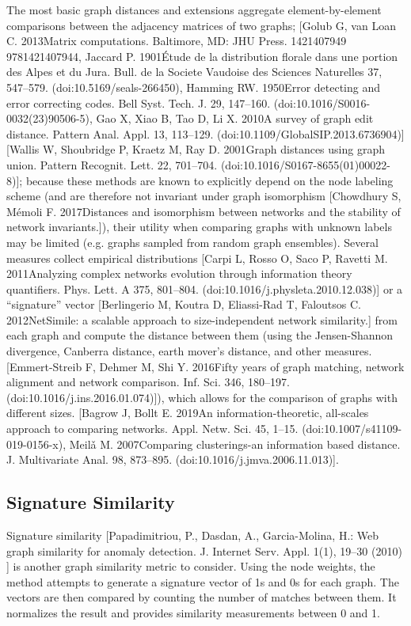 The most basic graph distances and extensions aggregate element-by-element comparisons between the adjacency matrices of two graphs; [Golub G, van Loan C. 2013Matrix computations. Baltimore, MD: JHU Press. 1421407949 9781421407944,  Jaccard P. 1901Étude de la distribution florale dans une portion des Alpes et du Jura. Bull. de la Societe Vaudoise des Sciences Naturelles 37, 547–579. (doi:10.5169/seals-266450),  Hamming RW. 1950Error detecting and error correcting codes. Bell Syst. Tech. J. 29, 147–160. (doi:10.1016/S0016-0032(23)90506-5),  Gao X, Xiao B, Tao D, Li X. 2010A survey of graph edit distance. Pattern Anal. Appl. 13, 113–129. (doi:10.1109/GlobalSIP.2013.6736904)][Wallis W, Shoubridge P, Kraetz M, Ray D. 2001Graph distances using graph union. Pattern Recognit. Lett. 22, 701–704. (doi:10.1016/S0167-8655(01)00022-8)]; because these methods are known to explicitly depend on the node labeling scheme (and are therefore not invariant under graph isomorphism [Chowdhury S, Mémoli F. 2017Distances and isomorphism between networks and the stability of network invariants.]), their utility when comparing graphs with unknown labels  may be limited (e.g. graphs sampled from random graph ensembles). Several measures collect empirical distributions [Carpi L, Rosso O, Saco P, Ravetti M. 2011Analyzing complex networks evolution through information theory quantifiers. Phys. Lett. A 375, 801–804. (doi:10.1016/j.physleta.2010.12.038)] or a “signature” vector [Berlingerio M, Koutra D, Eliassi-Rad T, Faloutsos C. 2012NetSimile: a scalable approach to size-independent network similarity.] from each graph and compute the distance between them (using the Jensen-Shannon divergence, Canberra distance, earth mover’s distance, and other measures. [Emmert-Streib F, Dehmer M, Shi Y. 2016Fifty years of graph matching, network alignment and network comparison. Inf. Sci. 346, 180–197. (doi:10.1016/j.ins.2016.01.074)]), which allows for the comparison of graphs with different sizes. [Bagrow J, Bollt E. 2019An information-theoretic, all-scales approach to comparing networks. Appl. Netw. Sci. 45, 1–15. (doi:10.1007/s41109-019-0156-x), Meilǎ M. 2007Comparing clusterings-an information based distance. J. Multivariate Anal. 98, 873–895. (doi:10.1016/j.jmva.2006.11.013)].

\subsection{Signature Similarity}
Signature similarity [Papadimitriou, P., Dasdan, A., Garcia-Molina, H.: Web graph similarity for anomaly detection. J. Internet Serv. Appl. 1(1), 19–30 (2010) ] is another graph similarity metric to consider. Using the node weights, the method attempts to generate a signature vector of 1s and 0s for each graph. The vectors are then compared by counting the number of matches between them. It normalizes the result and provides similarity measurements between 0 and 1.

